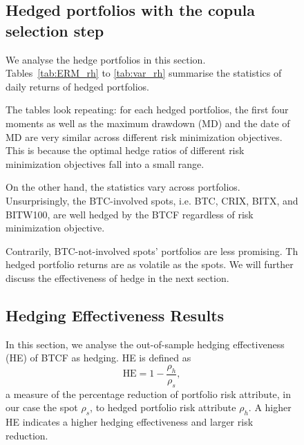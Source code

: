 \begin{figure}[!]
\subsection{Hedged portfolios with the copula selection step}\label{subsec:HP2}
We analyse the hedge portfolios in this section. 
Tables~\ref{tab:ERM_rh} to \ref{tab:var_rh} summarise the statistics
of daily returns of hedged portfolios.

The tables look repeating: for each hedged portfolios,
the first four moments as well as the maximum drawdown (MD) and the date of MD are very similar across different risk minimization objectives.
This is because the optimal hedge ratios of different risk minimization objectives fall into a small range. \medskip

On the other hand, the statistics vary across portfolios.
Unsurprisingly, the BTC-involved spots, i.e. BTC, CRIX, BITX, and BITW100, are well hedged by the BTCF regardless of risk minimization objective. \medskip

Contrarily, BTC-not-involved spots' portfolios are less promising.
Th hedged portfolio returns are as volatile as the spots.
We will further discuss the effectiveness of hedge in the next section. %

%
%
%
%
%
%



\subsection{Hedging Effectiveness Results}\label{sec: HE results}
In this section, we analyse the out-of-sample hedging effectiveness (HE) of BTCF as hedging.
HE is defined as $$\text{HE} = 1-\frac{\rho_h}{\rho_s},$$
a measure of the percentage reduction of portfolio risk attribute, in our case the spot $\rho_s$,
to hedged portfolio risk attribute $\rho_h$.
A higher HE indicates a higher hedging effectiveness and larger risk reduction. \medskip


\end{figure}
